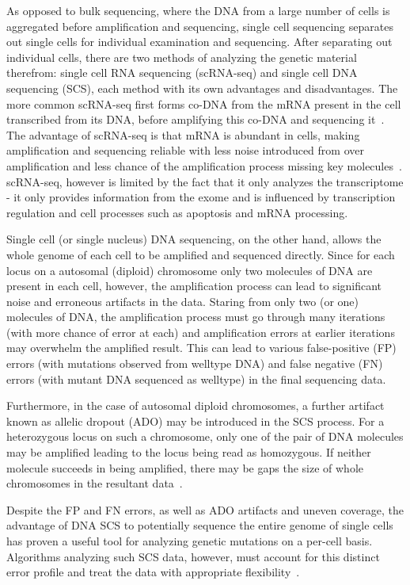 \documentclass[../../main.tex]{subfiles}
\begin{document}
As opposed to bulk sequencing, where the DNA from a large number of cells is aggregated before amplification and sequencing, single cell sequencing separates out single cells for individual examination and sequencing.
After separating out individual cells, there are two methods of analyzing the genetic material therefrom: single cell RNA sequencing (scRNA-seq) and single cell DNA sequencing (SCS), each method with its own advantages and disadvantages.
The more common scRNA-seq first forms co-DNA from the mRNA present in the cell transcribed from its DNA, before amplifying this co-DNA and sequencing it~\cite{rnaseq}.
The advantage of scRNA-seq is that mRNA is abundant in cells, making amplification and sequencing reliable with less noise introduced from over amplification and less chance of the amplification process missing key molecules~\cite{SCSadvance, onecelltime}.
scRNA-seq, however is limited by the fact that it only analyzes the transcriptome - it only provides information from the exome and is influenced by transcription regulation and cell processes such as apoptosis and mRNA processing\cite{cellity, biochemistry}.

Single cell (or single nucleus) DNA sequencing, on the other hand, allows the whole genome of each cell to be amplified and sequenced directly.
Since for each locus on a autosomal (diploid) chromosome only two molecules of DNA are present in each cell, however, the amplification process can lead to significant noise and erroneous artifacts in the data.
Staring from only two (or one) molecules of DNA, the amplification process must go through many iterations (with more chance of error at each) and amplification errors at earlier iterations may overwhelm the amplified result.
This can lead to various false-positive (FP) errors (with mutations observed from welltype DNA) and false negative (FN) errors (with mutant DNA sequenced as welltype) in the final sequencing data.

Furthermore, in the case of autosomal diploid chromosomes, a further artifact known as allelic dropout (ADO) may be introduced in the SCS process.
For a heterozygous locus on such a chromosome, only one of the pair of DNA molecules may be amplified leading to the locus being read as homozygous.
If neither molecule succeeds in being amplified, there may be gaps the size of whole chromosomes in the resultant data~\cite{monovar, sciphi, SCSadvance}.

Despite the FP and FN errors, as well as ADO artifacts and uneven coverage, the advantage of DNA SCS to potentially sequence the entire genome of single cells has proven a useful tool for analyzing genetic mutations on a per-cell basis.
Algorithms analyzing such SCS data, however, must account for this distinct error profile and treat the data with appropriate flexibility~\cite{monovar, sciphi}.
\end{document}

